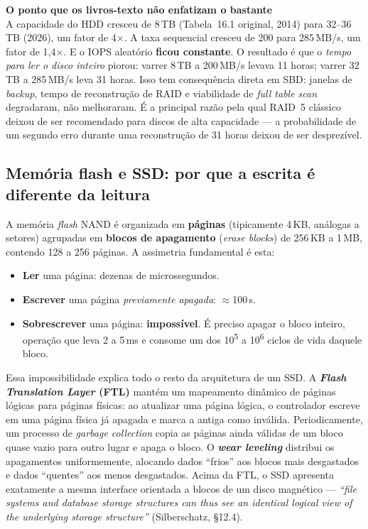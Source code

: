 \documentclass[11pt,a4paper]{article}
\newcommand{\destaque}[2]{%
  \begin{center}\begin{minipage}{0.96\textwidth}
  \colorbox{fundo}{\begin{minipage}{\dimexpr\linewidth-2\fboxsep}
  \vspace{3pt}\textbf{\color{azul}#1}\\[2pt]\small #2\vspace{4pt}
  \end{minipage}}\end{minipage}\end{center}}
\begin{document}
\destaque{O ponto que os livros-texto não enfatizam o bastante}{%
A capacidade do HDD cresceu de 8\,TB (Tabela~16.1 original, 2014) para 32--36\,TB (2026),
um fator de 4$\times$. A taxa sequencial cresceu de 200 para 285\,MB/s, um fator de
1,4$\times$. E o IOPS aleatório \textbf{ficou constante}. O resultado é que o \emph{tempo
para ler o disco inteiro} piorou: varrer 8\,TB a 200\,MB/s levava 11 horas; varrer 32\,TB a
285\,MB/s leva 31 horas. Isso tem consequência direta em SBD: janelas de \emph{backup},
tempo de reconstrução de RAID e viabilidade de \emph{full table scan} degradaram, não
melhoraram. É a principal razão pela qual RAID~5 clássico deixou de ser recomendado para
discos de alta capacidade --- a probabilidade de um segundo erro durante uma reconstrução
de 31 horas deixou de ser desprezível.}

\subsection{Memória flash e SSD: por que a escrita é diferente da leitura}

A memória \emph{flash} NAND é organizada em \textbf{páginas} (tipicamente 4\,KB, análogas a
setores) agrupadas em \textbf{blocos de apagamento} (\emph{erase blocks}) de 256\,KB a
1\,MB, contendo 128 a 256 páginas. A assimetria fundamental é esta:

\begin{itemize}
\item \textbf{Ler} uma página: dezenas de microssegundos.
\item \textbf{Escrever} uma página \emph{previamente apagada}: $\approx$100\,\textmu s.
\item \textbf{Sobrescrever} uma página: \textbf{impossível}. É preciso apagar o bloco
      inteiro, operação que leva 2 a 5\,ms e consome um dos 10\textsuperscript{5} a
      10\textsuperscript{6} ciclos de vida daquele bloco.
\end{itemize}

Essa impossibilidade explica todo o resto da arquitetura de um SSD. A
\textbf{\emph{Flash Translation Layer} (FTL)} mantém um mapeamento dinâmico de páginas
lógicas para páginas físicas: ao atualizar uma página lógica, o controlador escreve em uma
página física já apagada e marca a antiga como inválida. Periodicamente, um processo de
\emph{garbage collection} copia as páginas ainda válidas de um bloco quase vazio para outro
lugar e apaga o bloco. O \textbf{\emph{wear leveling}} distribui os apagamentos
uniformemente, alocando dados ``frios'' aos blocos mais desgastados e dados ``quentes'' aos
menos desgastados. Acima da FTL, o SSD apresenta exatamente a mesma interface orientada a
blocos de um disco magnético --- \emph{``file systems and database storage structures can
thus see an identical logical view of the underlying storage structure''} (Silberschatz,
§12.4).
\end{document}
